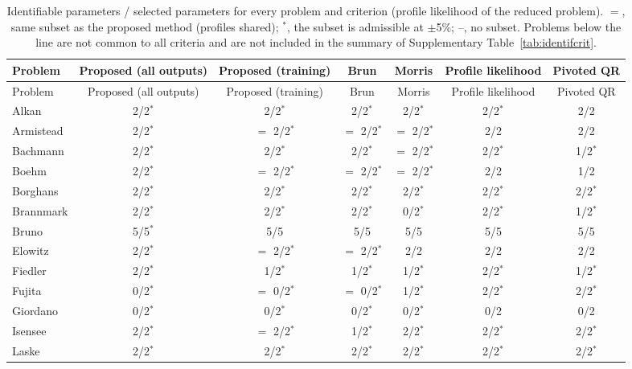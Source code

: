 \begin{longtable}{@{}lcccccc@{}}
\caption{Identifiable parameters / selected parameters for every problem and criterion (profile likelihood of the reduced problem). $=$, same subset as the proposed method (profiles shared); $^{\ast}$, the subset is admissible at $\pm$5\%; --, no subset. Problems below the line are not common to all criteria and are not included in the summary of Supplementary Table~\ref{tab:identifcrit}.}\label{tab:identifcritprob}\\
\toprule
Problem & Proposed (all outputs) & Proposed (training) & Brun & Morris & Profile likelihood & Pivoted QR \\
\midrule
\endfirsthead
\toprule
Problem & Proposed (all outputs) & Proposed (training) & Brun & Morris & Profile likelihood & Pivoted QR \\
\midrule
\endhead
Alkan & 2/2$^{\ast}$ & 2/2$^{\ast}$ & 2/2$^{\ast}$ & 2/2$^{\ast}$ & 2/2$^{\ast}$ & 2/2 \\
Armistead & 2/2$^{\ast}$ & $=$ 2/2$^{\ast}$ & $=$ 2/2$^{\ast}$ & $=$ 2/2$^{\ast}$ & 2/2 & 2/2 \\
Bachmann & 2/2$^{\ast}$ & 2/2$^{\ast}$ & 2/2$^{\ast}$ & $=$ 2/2$^{\ast}$ & 2/2$^{\ast}$ & 1/2$^{\ast}$ \\
Boehm & 2/2$^{\ast}$ & $=$ 2/2$^{\ast}$ & $=$ 2/2$^{\ast}$ & $=$ 2/2$^{\ast}$ & 2/2 & 1/2 \\
Borghans & 2/2$^{\ast}$ & 2/2$^{\ast}$ & 2/2$^{\ast}$ & 2/2$^{\ast}$ & 2/2$^{\ast}$ & 2/2$^{\ast}$ \\
Brannmark & 2/2$^{\ast}$ & 2/2$^{\ast}$ & 2/2$^{\ast}$ & 0/2$^{\ast}$ & 2/2$^{\ast}$ & 1/2$^{\ast}$ \\
Bruno & 5/5$^{\ast}$ & 5/5 & 5/5 & 5/5 & 5/5 & 5/5 \\
Elowitz & 2/2$^{\ast}$ & $=$ 2/2$^{\ast}$ & $=$ 2/2$^{\ast}$ & 2/2 & 2/2 & 2/2 \\
Fiedler & 2/2$^{\ast}$ & 1/2$^{\ast}$ & 1/2$^{\ast}$ & 1/2$^{\ast}$ & 2/2$^{\ast}$ & 1/2$^{\ast}$ \\
Fujita & 0/2$^{\ast}$ & $=$ 0/2$^{\ast}$ & $=$ 0/2$^{\ast}$ & 1/2$^{\ast}$ & 2/2$^{\ast}$ & 2/2$^{\ast}$ \\
Giordano & 0/2$^{\ast}$ & 0/2$^{\ast}$ & 0/2$^{\ast}$ & 0/2$^{\ast}$ & 0/2 & 0/2 \\
Isensee & 2/2$^{\ast}$ & $=$ 2/2$^{\ast}$ & 1/2$^{\ast}$ & 2/2$^{\ast}$ & 2/2$^{\ast}$ & 2/2$^{\ast}$ \\
Laske & 2/2$^{\ast}$ & 2/2$^{\ast}$ & 2/2$^{\ast}$ & 2/2$^{\ast}$ & 2/2$^{\ast}$ & 2/2$^{\ast}$ \\

\end{longtable}
